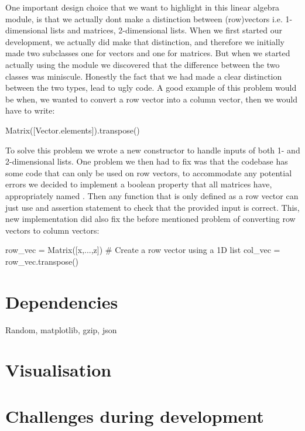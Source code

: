 \documentclass[a4paper,oneside,article,english]{memoir}
\begin{document}
One important design choice that we want to highlight in this linear algebra
module, is that we actually dont make a distinction between (row)vectors i.e.
1-dimensional lists and matrices, 2-dimensional lists. When we first started our
development, we actually did make that distinction, and therefore we initially
made two subclasses one for vectors and one for matrices. But when we started
actually using the module we discovered that the difference between the two
classes was miniscule. Honestly the fact that we had made a clear distinction
between the two types, lead to ugly code. A good example of this problem would
be when, we wanted to convert a row vector into a column vector, then we would
have to write:
\begin{python}
Matrix([Vector.elements]).transpose()
\end{python}
To solve this problem we wrote a new 
constructor to handle inputs of both 1- and 2-dimensional lists. One problem we
then had to fix was that the codebase has some code that can only be used on row
vectors, to accommodate any potential errors we decided to implement a boolean
property that all matrices have, appropriately named
. Then any function that is only defined as
a row vector can just use and assertion statement to check that the provided
 input is correct. This, new implementation did also fix
the before mentioned problem of converting row vectors to column vectors:
\begin{python}
row_vec = Matrix([x,...,z]) # Create a row vector using a 1D list 
col_vec = row_vec.transpose() 
\end{python}



\section{Dependencies}  
\label{sec:dependencies}
Random, matplotlib, gzip, json



\section{Visualisation}  
\label{ch:visualisation}




\section{Challenges during development}  
\label{sec:challenges_during_development}
\end{document}
